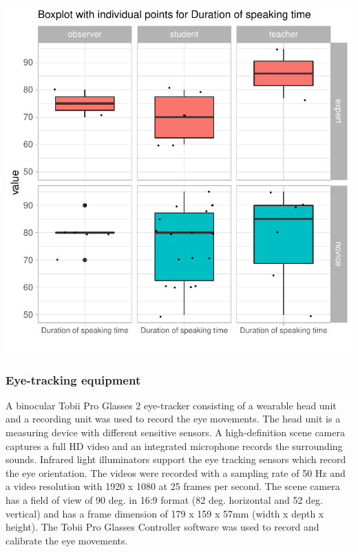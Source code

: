 \documentclass[
  english,
  man,floatsintext]{apa6}
\begin{document}
\includegraphics{paper_1_supplement_files/figure-latex/Duration speaking time-1.pdf}

\hypertarget{eye-tracking-equipment}{%
\subsubsection{Eye-tracking equipment}\label{eye-tracking-equipment}}

A binocular Tobii Pro Glasses 2 eye-tracker consisting of a wearable head unit and a recording unit was used to record the eye movements. The head unit is a measuring device with different sensitive sensors. A high-definition scene camera captures a full HD video and an integrated microphone records the surrounding sounds. Infrared light illuminators support the eye tracking sensors which record the eye orientation. The videos were recorded with a sampling rate of 50 Hz and a video resolution with 1920 x 1080 at 25 frames per second. The scene camera has a field of view of 90 deg. in 16:9 format (82 deg. horizontal and 52 deg. vertical) and has a frame dimension of 179 x 159 x 57mm (width x depth x height). The Tobii Pro Glasses Controller software was used to record and calibrate the eye movements.
\end{document}

